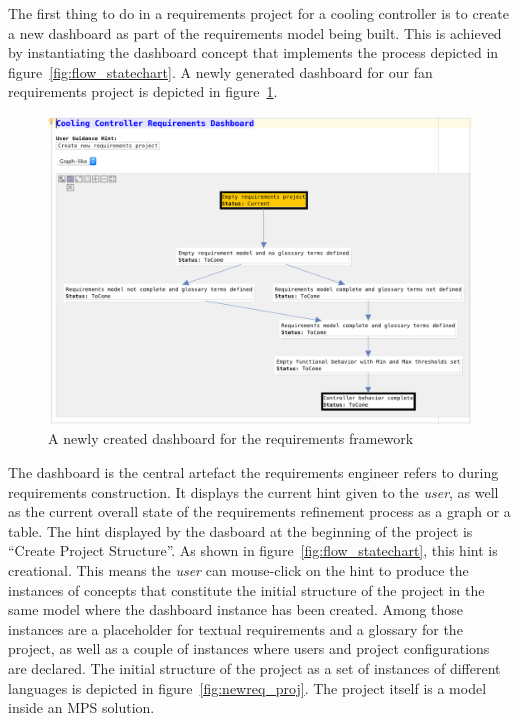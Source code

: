 The first thing to do in a requirements project for a cooling controller is to
create a new dashboard as part of the requirements model being built. This is
achieved by instantiating the \textsf{dashboard} concept that implements the
process depicted in figure~\ref{fig:flow_statechart}. A newly generated
dashboard for our fan requirements project is depicted in figure~\ref{fig:empty_dashboard}.

\begin{figure}[!h]
\centering 
\includegraphics[width=1\textwidth]{./figures/NewDashboard.png}
\caption{A newly created dashboard for the requirements framework}
\label{fig:empty_dashboard} 
\end{figure}

The dashboard is the central artefact the requirements engineer refers to during
requirements construction. It displays the current hint given to the
\emph{user}, as well as the current overall state of the requirements refinement
process as a graph or a table. The hint displayed by the dasboard at the
beginning of the project is ``Create Project Structure''. As shown in
figure~\ref{fig:flow_statechart}, this hint is creational. This means the
\emph{user} can mouse-click on the hint to produce the instances of concepts
that constitute the initial structure of the project in the same model where the
dashboard instance has been created. Among those instances are a placeholder for
textual requirements and a glossary for the project, as well as a couple of
instances where users and project configurations are declared. The initial
structure of the project as a set of instances of different languages is
depicted in figure~\ref{fig:newreq_proj}. The project itself is a model inside
an MPS solution.

